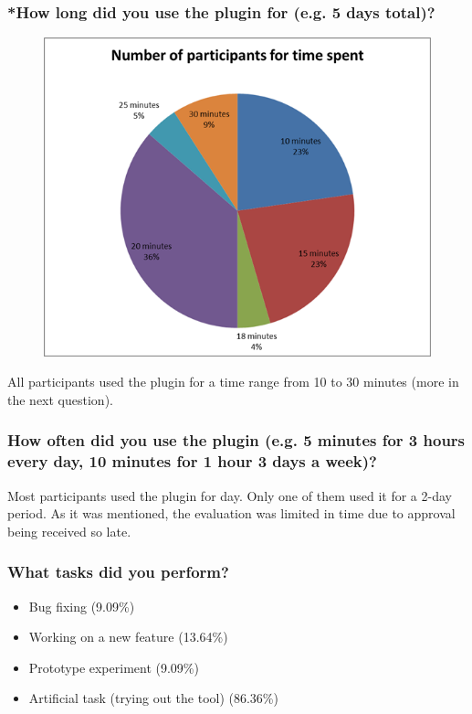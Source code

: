 \documentclass{l4proj}
\begin{document}
\subsubsection{*How long did you use the plugin for (e.g. 5 days total)?}

\begin{figure}[H]
\includegraphics[scale=0.6]{participants-time}
\centering
\label{fig:participants-time}
\end{figure}

All participants used the plugin for a time range from 10 to 30 minutes (more in the next question).

\subsubsection{How often did you use the plugin (e.g. 5 minutes for 3 hours every day, 10 minutes for 1 hour 3 days a week)?}

Most participants used the plugin for day. Only one of them used it for a 2-day period. As it was mentioned, the evaluation was limited in time due to approval being received so late.

\subsubsection{What tasks did you perform?}
\begin{itemize}
\item Bug fixing (9.09\%)
\item Working on a new feature (13.64\%)
\item Prototype experiment (9.09\%)
\item Artificial task (trying out the tool) (86.36\%)
\end{itemize}
\end{document}
